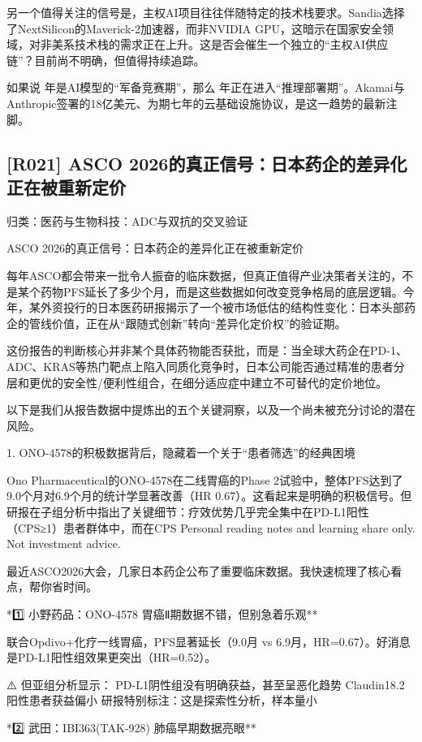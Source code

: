 \documentclass[11pt]{ctexart}
\begin{document}
另一个值得关注的信号是，主权AI项目往往伴随特定的技术栈要求。Sandia选择了NextSilicon的Maverick-2加速器，而非NVIDIA GPU，这暗示在国家安全领域，对非美系技术栈的需求正在上升。这是否会催生一个独立的“主权AI供应链”？目前尚不明确，但值得持续追踪。

如果说 年是AI模型的“军备竞赛期”，那么 年正在进入“推理部署期”。Akamai与Anthropic签署的18亿美元、为期七年的云基础设施协议，是这一趋势的最新注脚。

\subsection{[R021] ASCO 2026的真正信号：日本药企的差异化正在被重新定价}
{\small\color{refgray}归类：医药与生物科技：ADC与双抗的交叉验证}

ASCO 2026的真正信号：日本药企的差异化正在被重新定价

每年ASCO都会带来一批令人振奋的临床数据，但真正值得产业决策者关注的，不是某个药物PFS延长了多少个月，而是这些数据如何改变竞争格局的底层逻辑。今年，某外资投行的日本医药研报揭示了一个被市场低估的结构性变化：日本头部药企的管线价值，正在从“跟随式创新”转向“差异化定价权”的验证期。

这份报告的判断核心并非某个具体药物能否获批，而是：当全球大药企在PD-1、ADC、KRAS等热门靶点上陷入同质化竞争时，日本公司能否通过精准的患者分层和更优的安全性/便利性组合，在细分适应症中建立不可替代的定价地位。

以下是我们从报告数据中提炼出的五个关键洞察，以及一个尚未被充分讨论的潜在风险。

1. ONO-4578的积极数据背后，隐藏着一个关于“患者筛选”的经典困境

Ono Pharmaceutical的ONO-4578在二线胃癌的Phase 2试验中，整体PFS达到了9.0个月对6.9个月的统计学显著改善（HR 0.67）。这看起来是明确的积极信号。但研报在子组分析中指出了关键细节：疗效优势几乎完全集中在PD-L1阳性（CPS≥1）患者群体中，而在CPS Personal reading notes and learning share only. Not investment advice.

最近ASCO2026大会，几家日本药企公布了重要临床数据。我快速梳理了核心看点，帮你省时间。

*1️⃣ 小野药品：ONO-4578 胃癌Ⅱ期数据不错，但别急着乐观**

联合Opdivo+化疗一线胃癌，PFS显著延长（9.0月 vs 6.9月，HR=0.67）。好消息是PD-L1阳性组效果更突出（HR=0.52）。

⚠️ 但亚组分析显示： PD-L1阴性组没有明确获益，甚至呈恶化趋势 Claudin18.2阳性患者获益偏小 研报特别标注：这是探索性分析，样本量小

*2️⃣ 武田：IBI363(TAK-928) 肺癌早期数据亮眼**
\end{document}
